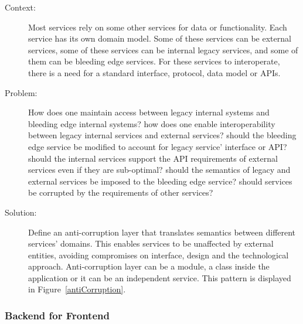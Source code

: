 \documentclass{bmcart}
\begin{document}
\begin{description}
  \item[Context:] Most services rely on some other services for data or functionality. Each service has its own domain model. Some of these services can be external services, some of these services can be internal legacy services, and some of them can be bleeding edge services. For these services to interoperate, there is a need for a standard interface, protocol, data model or APIs.  
  \item[Problem:] How does one maintain access between legacy internal systems and bleeding edge internal systems? how does one enable interoperability between legacy internal services and external services? should the bleeding edge service be modified to account for legacy service' interface or API? should the internal services support the API requirements of external services even if they are sub-optimal? should the semantics of legacy and external services be imposed to the bleeding edge service? should services be corrupted by the requirements of other services?  
  \item[Solution:] Define an anti-corruption layer that translates semantics between different services' domains. This enables services to be unaffected by external entities, avoiding compromises on interface, design and the technological approach. Anti-corruption layer can be a module, a class inside the application or it can be an independent service. This pattern is displayed in Figure~\ref{antiCorruption}.    
\end{description}



\subsubsection{Backend for Frontend}
\end{document}
